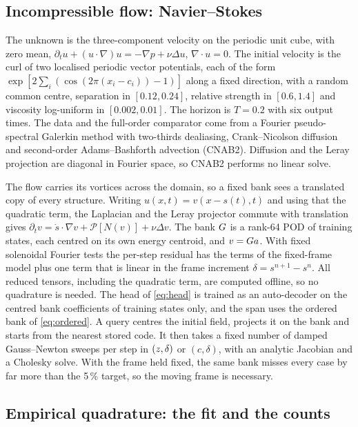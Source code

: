 \subsection{Incompressible flow: Navier--Stokes}
\label{app:method:ns}

The unknown is the three-component velocity on the periodic unit cube,
with zero mean, $\partial_t u+(u\cdot\nabla)u=-\nabla p+\nu\Delta u$,
$\nabla\cdot u=0$. The initial velocity is the curl of two localised
periodic vector potentials, each of the form
$\exp[2\sum_{i}(\cos(2\pi(x_i-c_i))-1)]$ along a fixed direction, with a
random common centre, separation in $[0.12,0.24]$, relative strength in
$[0.6,1.4]$ and viscosity log-uniform in $[0.002,0.01]$. The horizon is
$T=0.2$ with six output times. The data and the full-order comparator
come from a Fourier pseudo-spectral Galerkin method with two-thirds
dealiasing, Crank--Nicolson diffusion and second-order Adams--Bashforth
advection (CNAB2). Diffusion and the Leray projection are diagonal in
Fourier space, so CNAB2 performs no linear solve.

The flow carries its vortices across the domain, so a fixed bank sees a
translated copy of every structure. Writing $u(x,t)=v(x-s(t),t)$ and
using that the quadratic term, the Laplacian and the Leray projector
commute with translation gives
$\partial_t v=\dot s\cdot\nabla v+\mathcal P[N(v)]+\nu\Delta v$. The bank
$G$ is a rank-64 POD of training states, each centred on its own
energy centroid, and $v=G a$. With fixed solenoidal Fourier tests the
per-step residual has the terms of the fixed-frame model plus one term
that is linear in the frame increment $\delta=s^{n+1}-s^{n}$. All reduced
tensors, including the quadratic term, are computed offline, so no
quadrature is needed. The head of \eqref{eq:head} is trained as an
auto-decoder on the centred bank coefficients of training states only,
and the span uses the ordered bank of \eqref{eq:ordered}. A query centres
the initial field, projects it on the bank and starts from the nearest
stored code. It then takes a fixed number of damped Gauss--Newton sweeps
per step in $(z,\delta)$ or $(c,\delta)$, with an analytic Jacobian
and a Cholesky solve. With the frame held fixed, the same bank misses
every case by far more than the 5\,\% target, so the moving frame is
necessary.

\subsection{Empirical quadrature: the fit and the counts}
\label{app:method:eq}

